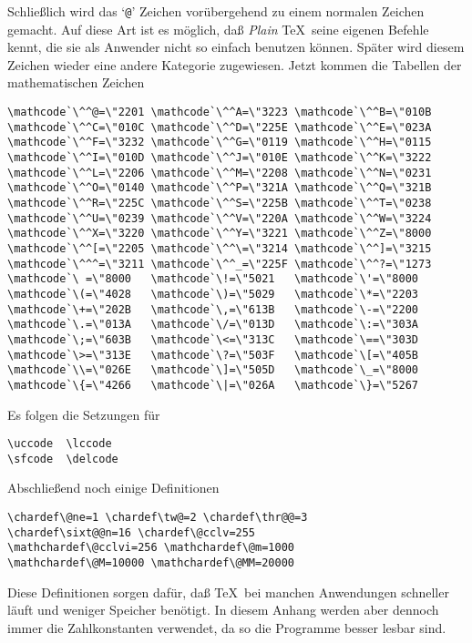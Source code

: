 \begin{appendix}
Schlie\ss{}lich wird das `\verb|@|' Zeichen vor\"ubergehend zu einem
normalen Zeichen gemacht. Auf diese Art ist es m\"oglich, da\ss{} {\em
Plain} \TeX\ seine eigenen Befehle kennt, die sie als Anwender nicht
so einfach benutzen k\"onnen. Sp\"ater wird diesem Zeichen wieder eine
andere Kategorie zugewiesen. Jetzt kommen die Tabellen der
mathematischen Zeichen
\begin{verbatim}
\mathcode`\^^@=\"2201 \mathcode`\^^A=\"3223 \mathcode`\^^B=\"010B
\mathcode`\^^C=\"010C \mathcode`\^^D=\"225E \mathcode`\^^E=\"023A
\mathcode`\^^F=\"3232 \mathcode`\^^G=\"0119 \mathcode`\^^H=\"0115
\mathcode`\^^I=\"010D \mathcode`\^^J=\"010E \mathcode`\^^K=\"3222
\mathcode`\^^L=\"2206 \mathcode`\^^M=\"2208 \mathcode`\^^N=\"0231
\mathcode`\^^O=\"0140 \mathcode`\^^P=\"321A \mathcode`\^^Q=\"321B
\mathcode`\^^R=\"225C \mathcode`\^^S=\"225B \mathcode`\^^T=\"0238
\mathcode`\^^U=\"0239 \mathcode`\^^V=\"220A \mathcode`\^^W=\"3224
\mathcode`\^^X=\"3220 \mathcode`\^^Y=\"3221 \mathcode`\^^Z=\"8000
\mathcode`\^^[=\"2205 \mathcode`\^^\=\"3214 \mathcode`\^^]=\"3215
\mathcode`\^^^=\"3211 \mathcode`\^^_=\"225F \mathcode`\^^?=\"1273
\mathcode`\ =\"8000   \mathcode`\!=\"5021   \mathcode`\'=\"8000
\mathcode`\(=\"4028   \mathcode`\)=\"5029   \mathcode`\*=\"2203
\mathcode`\+=\"202B   \mathcode`\,=\"613B   \mathcode`\-=\"2200
\mathcode`\.=\"013A   \mathcode`\/=\"013D   \mathcode`\:=\"303A
\mathcode`\;=\"603B   \mathcode`\<=\"313C   \mathcode`\==\"303D
\mathcode`\>=\"313E   \mathcode`\?=\"503F   \mathcode`\[=\"405B
\mathcode`\\=\"026E   \mathcode`\]=\"505D   \mathcode`\_=\"8000
\mathcode`\{=\"4266   \mathcode`\|=\"026A   \mathcode`\}=\"5267
\end{verbatim}
Es folgen die Setzungen f\"ur
\begin{verbatim}
\uccode  \lccode
\sfcode  \delcode
\end{verbatim}
Abschlie\ss{}end noch einige Definitionen
\begin{verbatim}
\chardef\@ne=1 \chardef\tw@=2 \chardef\thr@@=3
\chardef\sixt@@n=16 \chardef\@cclv=255
\mathchardef\@cclvi=256 \mathchardef\@m=1000
\mathchardef\@M=10000 \mathchardef\@MM=20000
\end{verbatim}
Diese Definitionen sorgen daf\"ur, da\ss{} \TeX\ bei manchen Anwendungen
schneller l\"auft und weniger Speicher ben\"otigt. In diesem Anhang werden
aber dennoch immer die Zahlkonstanten verwendet, da so die Programme
besser lesbar sind.

\end{appendix}
